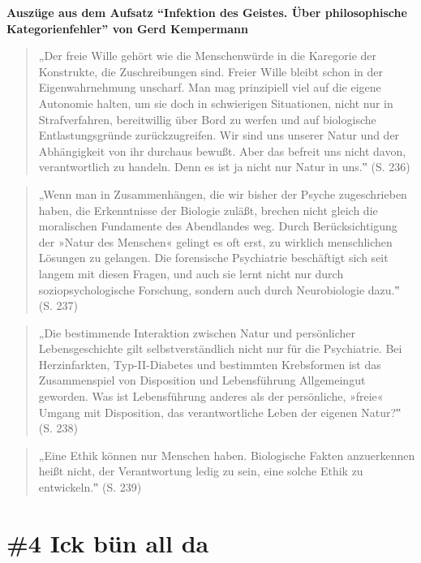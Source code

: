 \documentclass[
  a4paper,
]{report}
\begin{document}
\textbf{Auszüge aus dem Aufsatz ``Infektion des Geistes. Über philosophische Kategorienfehler'' von Gerd Kempermann \citeyearpar{Kempermann2004}}

\begin{quote}
„Der freie Wille gehört wie die Menschenwürde in die Karegorie der Konstrukte, die Zuschreibungen sind. Freier Wille bleibt schon in der Eigenwahrnehmung unscharf. Man mag prinzipiell viel auf die eigene Autonomie halten, um sie doch in schwierigen Situationen, nicht nur in Strafverfahren, bereitwillig über Bord zu werfen und auf biologische Entlastungsgründe zurückzugreifen. Wir sind uns unserer Natur und der Abhängigkeit von ihr durchaus bewußt. Aber das befreit uns nicht davon, verantwortlich zu handeln. Denn es ist ja nicht nur Natur in uns.‟ (S. 236)
\end{quote}

\begin{quote}
„Wenn man in Zusammenhängen, die wir bisher der Psyche zugeschrieben haben, die Erkenntnisse der Biologie zuläßt, brechen nicht gleich die moralischen Fundamente des Abendlandes weg. Durch Berücksichtigung der »Natur des Menschen« gelingt es oft erst, zu wirklich menschlichen Lösungen zu gelangen. Die forensische Psychiatrie beschäftigt sich seit langem mit diesen Fragen, und auch sie lernt nicht nur durch soziopsychologische Forschung, sondern auch durch Neurobiologie dazu.‟ (S. 237)
\end{quote}

\begin{quote}
„Die bestimmende Interaktion zwischen Natur und persönlicher Lebensgeschichte gilt selbstverständlich nicht nur für die Psychiatrie. Bei Herzinfarkten, Typ-II-Diabetes und bestimmten Krebsformen ist das Zusammenspiel von Disposition und Lebensführung Allgemeingut geworden. Was ist Lebensführung anderes als der persönliche, »freie« Umgang mit Disposition, das verantwortliche Leben der eigenen Natur?‟ (S. 238)
\end{quote}

\begin{quote}
„Eine Ethik können nur Menschen haben. Biologische Fakten anzuerkennen heißt nicht, der Verantwortung ledig zu sein, eine solche Ethik zu entwickeln.‟ (S. 239)
\end{quote}

\hypertarget{def-ev4}{%
\section{\#4 Ick bün all da}\label{def-ev4}}
\end{document}
